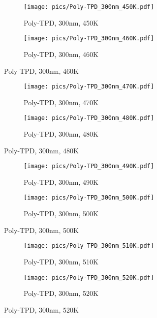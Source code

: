 \begin{figure}[!htb]
\centering
\begin{subfigure}[t]{.5\textwidth}
  \centering
  \texttt{[image: pics/Poly-TPD\_300nm\_450K.pdf]}
  \caption{Poly-TPD, 300nm, 450K}
  \label{fig:sub81}
\end{subfigure}%
\begin{subfigure}[t]{.5\textwidth}
  \centering
  \texttt{[image: pics/Poly-TPD\_300nm\_460K.pdf]}
  \caption{Poly-TPD, 300nm, 460K}
  \label{fig:sub82}
\end{subfigure}%
\end{figure}

\begin{figure}[!htb]
\centering
\begin{subfigure}[t]{.5\textwidth}
  \centering
  \texttt{[image: pics/Poly-TPD\_300nm\_470K.pdf]}
  \caption{Poly-TPD, 300nm, 470K}
  \label{fig:sub83}
\end{subfigure}%
\begin{subfigure}[t]{.5\textwidth}
  \centering
  \texttt{[image: pics/Poly-TPD\_300nm\_480K.pdf]}
  \caption{Poly-TPD, 300nm, 480K}
  \label{fig:sub84}
\end{subfigure}%
\end{figure}

\begin{figure}[!htb]
\centering
\begin{subfigure}[t]{.5\textwidth}
  \centering
  \texttt{[image: pics/Poly-TPD\_300nm\_490K.pdf]}
  \caption{Poly-TPD, 300nm, 490K}
  \label{fig:sub85}
\end{subfigure}%
\begin{subfigure}[t]{.5\textwidth}
  \centering
  \texttt{[image: pics/Poly-TPD\_300nm\_500K.pdf]}
  \caption{Poly-TPD, 300nm, 500K}
  \label{fig:sub86}
\end{subfigure}%
\end{figure}

\begin{figure}[!htb]
\centering
\begin{subfigure}[t]{.5\textwidth}
  \centering
  \texttt{[image: pics/Poly-TPD\_300nm\_510K.pdf]}
  \caption{Poly-TPD, 300nm, 510K}
  \label{fig:sub87}
\end{subfigure}%
\begin{subfigure}[t]{.5\textwidth}
  \centering
  \texttt{[image: pics/Poly-TPD\_300nm\_520K.pdf]}
  \caption{Poly-TPD, 300nm, 520K}
  \label{fig:sub88}
\end{subfigure}%
\end{figure}

